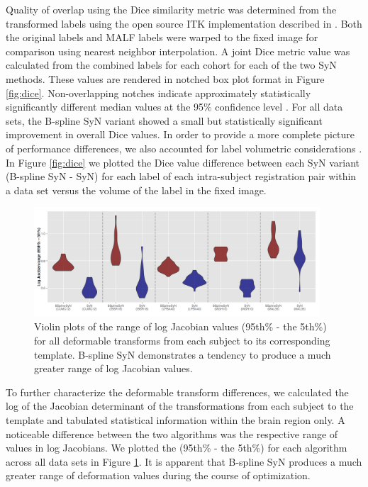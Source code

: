 \documentclass{frontiersSCNS}
\begin{document}
Quality of overlap  using the 
Dice similarity metric 
was determined from the transformed labels
using the open source ITK
implementation described in \cite{tustison2009a}.
Both the original labels and MALF labels were warped
to the fixed image for comparison using nearest neighbor
interpolation.  A joint Dice metric value was calculated
from the combined labels for each cohort for each of the
two SyN methods.  These values are rendered in notched
box plot format in Figure \ref{fig:dice}.  Non-overlapping notches
indicate approximately statistically significantly different median values
at the 95\% confidence level \citep{mcgill1978}.
For all data sets, the B-spline SyN variant showed a small but statistically
significant improvement in overall Dice values.
In order to provide a more complete picture of performance differences,
we also accounted for label volumetric considerations \citep{rohlfing2012}.  In Figure
\ref{fig:dice} we plotted the Dice value difference between each
SyN variant (B-spline SyN - SyN) for each label of each intra-subject
registration pair within a data set versus the volume of the label
in the fixed image.  

\begin{figure}[htb]
  \centering
    \includegraphics[width=0.95\textwidth]{jacobianRange.jpg}
  \caption{Violin plots of the range of log Jacobian values 
           (95th\% - the 5th\%)  
           for all deformable
           transforms from each subject to its corresponding
           template.  B-spline SyN demonstrates a tendency 
           to produce a much
           greater range of log Jacobian values.
           }
  \label{fig:jacobian}
\end{figure}

To further characterize the deformable transform differences, we 
calculated the log of the Jacobian determinant of the transformations from 
each subject to the template and 
tabulated statistical information within the brain region only. 
A noticeable difference between the two algorithms was the
respective range of values in log Jacobians.  We plotted the 
(95th\% - the 5th\%) for each algorithm across all data sets
 in Figure \ref{fig:jacobian}.  It is apparent 
that B-spline SyN produces a much greater range of deformation
values during the course of optimization.
\end{document}
